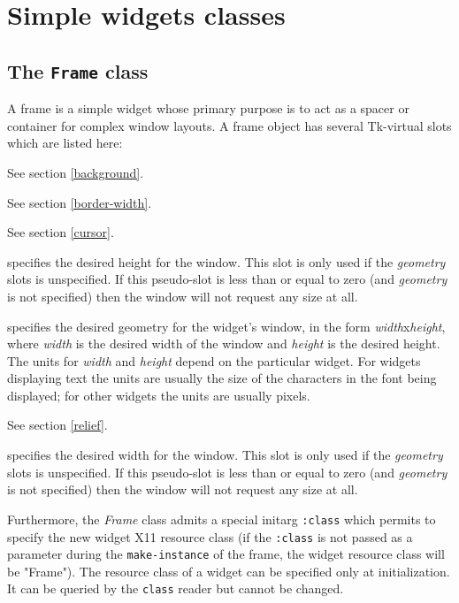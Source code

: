 \section{Simple widgets classes}

\subsection{The {\tt Frame} class}

A frame is a {\stklos} simple widget whose primary purpose is to act as a
spacer or container for complex window layouts. A frame object has several
Tk-virtual slots which are listed here:

\begin{ip}

See section \ref{background}.

See section \ref{border-width}.

See section \ref{cursor}.

\label{height}
specifies the desired height for the window. This slot is only
used if the {\em geometry} slots is unspecified. If this pseudo-slot is less than 
or equal to zero (and {\em geometry} is not specified) then the window will 
not request any size at all.

\label{geometry}
specifies the desired geometry for the widget's window, in the
form {\em width}x{\em height}, where {\em width} is the desired
width of the window and {\em height} is the desired height.  The
units for {\em width} and {\em height} depend on the particular
widget.  For widgets displaying text the units are usually the
size of the characters in the font being displayed;  for other
widgets the units are usually pixels.

See section \ref{relief}.

specifies the desired width for the window. This slot is only
used if the {\em geometry} slots is unspecified. If this pseudo-slot is less than 
or equal to zero (and {\em  geometry} is not specified) then the window will 
not request any size at all.
\end{ip}

\noindent
Furthermore, the {\em Frame} class admits a special initarg {\tt :class} which
permits to specify the new widget X11 resource class (if the {\tt :class} is
not passed as a parameter during the {\tt make-instance} of the frame, the
widget resource class will be "Frame"). The resource class of a widget can be
specified only at initialization. It can be queried by the {\tt class} reader
but cannot be changed.

